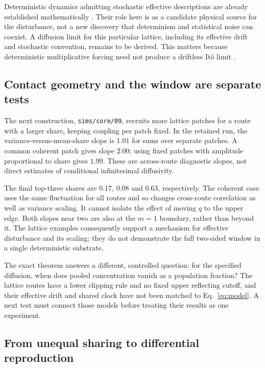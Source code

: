 Deterministic dynamics admitting stochastic effective descriptions are already
established mathematically \cite{melbourne,gottwald}. Their role here is as a
candidate physical source for the disturbance, not a new discovery that
determinism and statistical noise can coexist. A diffusion limit for this
particular lattice, including its effective drift and stochastic convention,
remains to be derived. This matters because deterministic multiplicative
forcing need not produce a driftless It\^o limit \cite{gottwald}.

\subsection{Contact geometry and the window are separate tests}

The next construction, \texttt{sims/core/09}, recruits more lattice patches for
a route with a larger share, keeping coupling per patch fixed. In the retained
run, the variance-versus-mean-share slope is $1.01$ for sums over separate
patches. A common coherent patch gives slope $2.00$; using fixed patches with
amplitude proportional to share gives $1.99$. These are across-route diagnostic
slopes, not direct estimates of conditional infinitesimal diffusivity.

The final top-three shares are $0.17$, $0.08$ and $0.63$, respectively.
The coherent case uses the same fluctuation for all routes and so changes
cross-route correlation as well as variance scaling. It cannot isolate the
effect of moving $q$ to the upper edge. Both slopes near two are also at the
$m=1$ boundary, rather than beyond it. The lattice examples consequently
support a mechanism for effective disturbance and its scaling; they do not
demonstrate the full two-sided window in a single deterministic substrate.

The exact theorem answers a different, controlled question: for the specified
diffusion, when does pooled concentration vanish as a population fraction?
The lattice routes have a lower clipping rule and no fixed upper reflecting
cutoff, and their effective drift and shared clock have not been matched to
Eq.~\eqref{eq:model}. A next test must connect those models before treating
their results as one experiment.

\subsection{From unequal sharing to differential reproduction}

